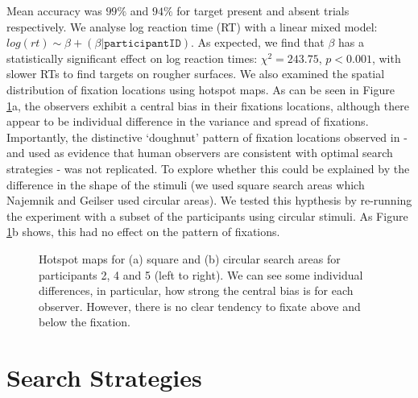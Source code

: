 \documentclass[man]{apa6}
\begin{document}
Mean accuracy was $99\%$ and $94\%$ for target present and absent trials respectively. We analyse log reaction time (RT) with a linear mixed model: $log(rt) \sim \beta +(\beta|\texttt{participantID})$. As expected, we find that $\beta$ has a statistically significant effect on log reaction times: $\chi^2=243.75$, $p<0.001$, with slower RTs to find targets on rougher surfaces. We also examined the spatial distribution of fixation locations using hotspot maps. As can be seen in Figure \ref{fig:hotspots}a, the observers exhibit a central bias \parencite{tatler2007} in their fixations locations, although there appear to be individual difference in the variance and spread of fixations. Importantly, the distinctive `doughnut' pattern of fixation locations observed in \textcite{najemnik-geisler2008} - and used as evidence that human observers are consistent with optimal search strategies - was not replicated. To explore whether this could be explained by the difference in the shape of the stimuli (we used square search areas which Najemnik and Geilser used circular areas). We tested this hypthesis by re-running the experiment with a subset of the participants using circular stimuli. As Figure \ref{fig:hotspots}b shows, this had no effect on the pattern of fixations.

\begin{figure}
	\centering
	\caption{Hotspot maps for (a) square and (b) circular search areas for participants 2, 4 and 5 (left to right). We can see some individual differences, in particular, how strong the central bias is for each observer. However, there is no clear tendency to fixate above and below the fixation.} 
	\label{fig:hotspots}	
\end{figure}


\section{Search Strategies}
\label{sec:strats}
\end{document}
